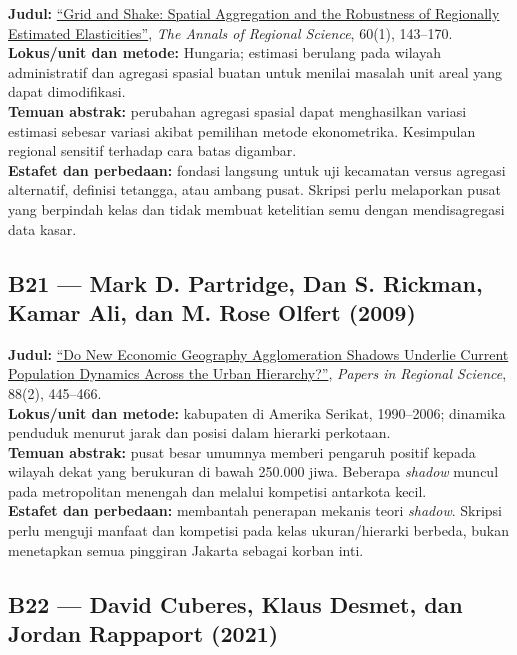 \documentclass[
  indonesian,
  11pt,
  a4paper,
  oneside,
  openany]{report}
\begin{document}
\textbf{Judul:} \href{https://doi.org/10.1007/s00168-017-0849-y}{``Grid
and Shake: Spatial Aggregation and the Robustness of Regionally
Estimated Elasticities''}, \emph{The Annals of Regional Science}, 60(1),
143--170.\\
\textbf{Lokus/unit dan metode:} Hungaria; estimasi berulang pada wilayah
administratif dan agregasi spasial buatan untuk menilai masalah unit
areal yang dapat dimodifikasi.\\
\textbf{Temuan abstrak:} perubahan agregasi spasial dapat menghasilkan
variasi estimasi sebesar variasi akibat pemilihan metode ekonometrika.
Kesimpulan regional sensitif terhadap cara batas digambar.\\
\textbf{Estafet dan perbedaan:} fondasi langsung untuk uji kecamatan
versus agregasi alternatif, definisi tetangga, atau ambang pusat.
Skripsi perlu melaporkan pusat yang berpindah kelas dan tidak membuat
ketelitian semu dengan mendisagregasi data kasar.

\subsection{B21 --- Mark D. Partridge, Dan S. Rickman, Kamar Ali, dan M.
Rose Olfert
(2009)}\label{b21-mark-d.-partridge-dan-s.-rickman-kamar-ali-dan-m.-rose-olfert-2009}

\textbf{Judul:}
\href{https://doi.org/10.1111/j.1435-5957.2008.00211.x}{``Do New
Economic Geography Agglomeration Shadows Underlie Current Population
Dynamics Across the Urban Hierarchy?''}, \emph{Papers in Regional
Science}, 88(2), 445--466.\\
\textbf{Lokus/unit dan metode:} kabupaten di Amerika Serikat,
1990--2006; dinamika penduduk menurut jarak dan posisi dalam hierarki
perkotaan.\\
\textbf{Temuan abstrak:} pusat besar umumnya memberi pengaruh positif
kepada wilayah dekat yang berukuran di bawah 250.000 jiwa. Beberapa
\emph{shadow} muncul pada metropolitan menengah dan melalui kompetisi
antarkota kecil.\\
\textbf{Estafet dan perbedaan:} membantah penerapan mekanis teori
\emph{shadow}. Skripsi perlu menguji manfaat dan kompetisi pada kelas
ukuran/hierarki berbeda, bukan menetapkan semua pinggiran Jakarta
sebagai korban inti.

\subsection{B22 --- David Cuberes, Klaus Desmet, dan Jordan Rappaport
(2021)}\label{b22-david-cuberes-klaus-desmet-dan-jordan-rappaport-2021}
\end{document}
